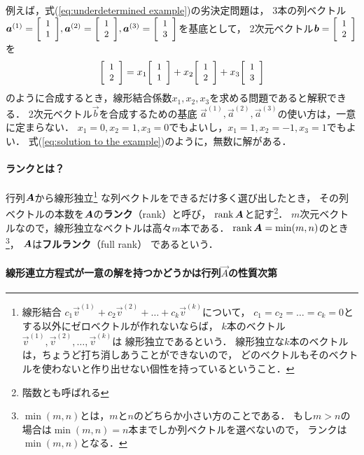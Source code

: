 例えば，式(\ref{eq:underdetermined example})の劣決定問題は，
3本の列ベクトル
$\vec a^{(1)}=\smatrix{\small}{c}{1\\ 1},\vec a^{(2)}=\smatrix{\small}{c}{1\\ 2},\vec a^{(3)}=\smatrix{\small}{c}{1\\ 3}$を基底として，
2次元ベクトル$\vec b=\smatrix{\small}{c}{1\\ 2}$を
\[
\smatrix{\small}{c}{1\\ 2}
=x_1\smatrix{\small}{c}{1\\ 1}+x_2\smatrix{\small}{c}{1\\ 2}+x_3\smatrix{\small}{c}{1\\ 3}
\]
のように合成するとき，線形結合係数$x_1,x_2,x_3$を求める問題であると解釈できる．
2次元ベクトル$\vec b$を合成するための基底
$\vec a^{(1)},\vec a^{(2)},\vec a^{(3)}$の使い方は，一意に定まらない．
$x_1=0,x_2=1,x_3=0$でもよいし，$x_1=1,x_2=-1,x_3=1$でもよい．
式(\ref{eq:solution to the example})のように，無数に解がある．

\paragraph{ランクとは？}

行列$\mtr A$から線形独立\footnote{%
線形結合
$c_1\vec v^{(1)}+c_2\vec v^{(2)}+\dots+c_k\vec v^{(k)}$について，
$c_1=c_2=\dots=c_k=0$とする以外にゼロベクトルが作れないならば，
$k$本のベクトル$\vec v^{(1)},\vec v^{(2)},\dots,\vec v^{(k)}$は
線形独立であるという．
線形独立な$k$本のベクトルは，ちょうど打ち消しあうことができないので，
どのベクトルもそのベクトルを使わないと作り出せない個性を持っているということ．
}%
な列ベクトルをできるだけ多く選び出したとき，
その列ベクトルの本数を$\mtr A$の{\bf ランク}（rank）と呼び，
$\rank\mtr A$と記す\footnote{階数とも呼ばれる}．
$m$次元ベクトルなので，線形独立なベクトルは高々$m$本である．
$\rank\mtr A=\min(m,n)$のとき\footnote{%
$\min(m,n)$とは，$m$と$n$のどちらか小さい方のことである．
もし$m>n$の場合は$\min(m,n)=n$本までしか列ベクトルを選べないので，
ランクは$\min(m,n)$となる．}，
$\mtr A$は{\bf フルランク}（full rank）
であるという．

\paragraph{線形連立方程式が一意の解を持つかどうかは行列$\vec A$の性質次第}

